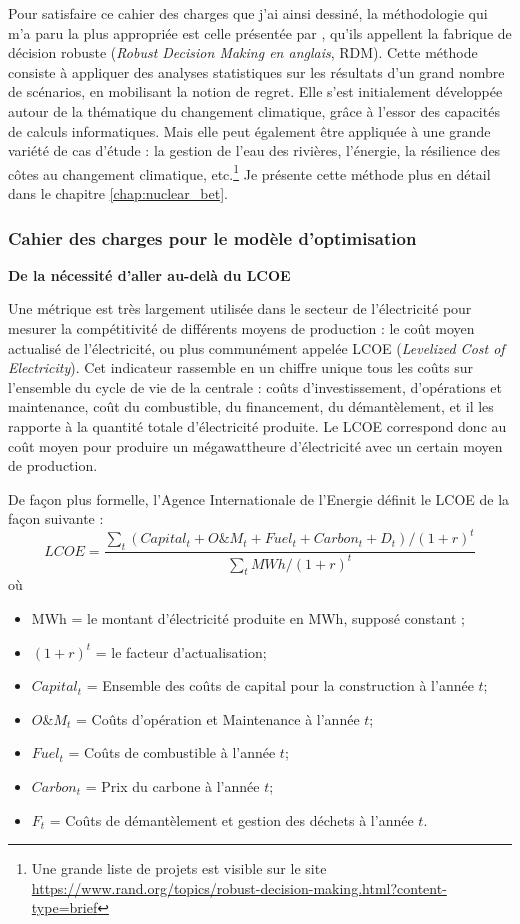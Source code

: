 Pour satisfaire ce cahier des charges que j’ai ainsi dessiné, la méthodologie qui m’a paru la plus appropriée est celle présentée par \citet{Lempert2006}, qu’ils appellent la fabrique de décision robuste (\textit{Robust Decision Making en anglais}, RDM). Cette méthode consiste à appliquer des analyses statistiques sur les résultats d’un grand nombre de scénarios, en mobilisant la notion de regret. Elle s’est initialement développée autour de la thématique du changement climatique, grâce à l’essor des capacités de calculs informatiques. Mais elle peut également être appliquée à une grande variété de cas d’étude : la gestion de l’eau des rivières, l’énergie, la résilience des côtes au changement climatique, etc.\footnote{Une grande liste de projets est visible sur le site \url{https://www.rand.org/topics/robust-decision-making.html?content-type=brief}} Je présente cette méthode plus en détail dans le chapitre \ref{chap:nuclear_bet}.
	
\subsubsection{Cahier des charges pour le modèle d’optimisation}

\textbf{De la nécessité d’aller au-delà du LCOE}

Une métrique est très largement utilisée dans le secteur de l’électricité pour mesurer la compétitivité de différents moyens de production : le coût moyen actualisé de l’électricité, ou plus communément appelée LCOE (\textit{Levelized Cost of Electricity}).
Cet indicateur rassemble en un chiffre unique tous les coûts sur l’ensemble du cycle de vie de la centrale : coûts d’investissement, d’opérations et maintenance, coût du combustible, du financement, du démantèlement, et il les rapporte à la quantité totale d’électricité produite. Le LCOE correspond donc au coût moyen pour produire un mégawattheure d’électricité avec un certain moyen de production.

De façon plus formelle, l'Agence Internationale de l'Energie définit le LCOE de la façon suivante \citep{IEA2015}:
$$LCOE = \frac{\sum_t (Capital_t + O\&M_t + Fuel_t + Carbon_t + D_t) / (1+r)^t}{\sum_t MWh / (1+r)^t}$$
où
\begin{itemize}
	\item MWh = le montant d'électricité produite en MWh, supposé constant ;
	\item $(1+r)^t$ = le facteur d'actualisation;
	\item $Capital_t$ = Ensemble des coûts de capital pour la construction à l'année $t$;
	\item $O\&M_t$ = Coûts d'opération et Maintenance à l'année $t$;
	\item $Fuel_t$ = Coûts de combustible à l'année $t$;
	\item $Carbon_t$ = Prix du carbone à l'année $t$;
	\item $F_t$ = Coûts de démantèlement et gestion des déchets à l'année $t$.
\end{itemize}

